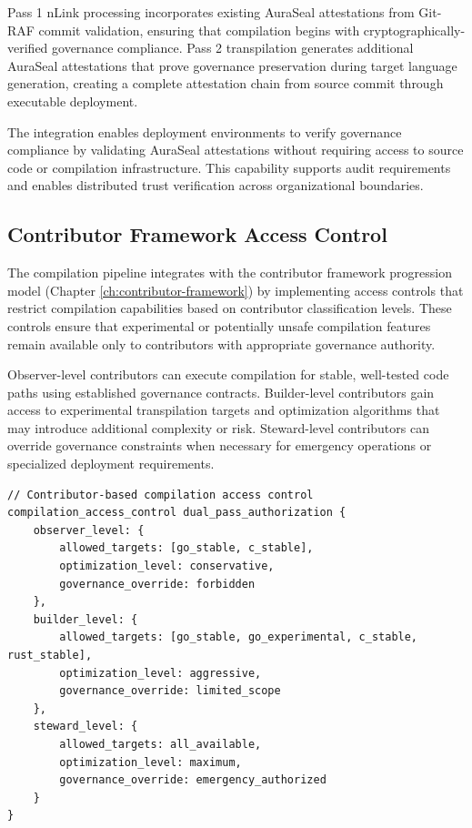 Pass 1 nLink processing incorporates existing AuraSeal attestations from Git-RAF commit validation, ensuring that compilation begins with cryptographically-verified governance compliance. Pass 2 transpilation generates additional AuraSeal attestations that prove governance preservation during target language generation, creating a complete attestation chain from source commit through executable deployment.

The integration enables deployment environments to verify governance compliance by validating AuraSeal attestations without requiring access to source code or compilation infrastructure. This capability supports audit requirements and enables distributed trust verification across organizational boundaries.

\subsection{Contributor Framework Access Control}

The compilation pipeline integrates with the contributor framework progression model (Chapter \ref{ch:contributor-framework}) by implementing access controls that restrict compilation capabilities based on contributor classification levels. These controls ensure that experimental or potentially unsafe compilation features remain available only to contributors with appropriate governance authority.

Observer-level contributors can execute compilation for stable, well-tested code paths using established governance contracts. Builder-level contributors gain access to experimental transpilation targets and optimization algorithms that may introduce additional complexity or risk. Steward-level contributors can override governance constraints when necessary for emergency operations or specialized deployment requirements.

\begin{lstlisting}[style=riftlang, language=rift]
// Contributor-based compilation access control
compilation_access_control dual_pass_authorization {
    observer_level: {
        allowed_targets: [go_stable, c_stable],
        optimization_level: conservative,
        governance_override: forbidden
    },
    builder_level: {
        allowed_targets: [go_stable, go_experimental, c_stable, rust_stable],
        optimization_level: aggressive,
        governance_override: limited_scope
    },
    steward_level: {
        allowed_targets: all_available,
        optimization_level: maximum,
        governance_override: emergency_authorized
    }
}
\end{lstlisting}

